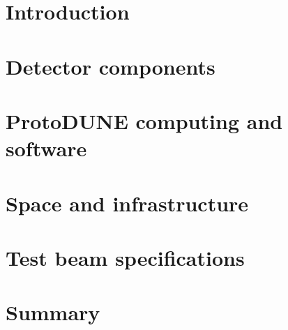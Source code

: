 \ifdefined\isfinal\documentclass[final]{pd-tdr}\else\documentclass{pd-tdr}\fi
\begin{document}






\chapter{Introduction}


\chapter{Detector components} 


\chapter{ProtoDUNE computing and software}


\chapter{Space and infrastructure}


\chapter{Test beam specifications} 


\chapter{Summary}
%

\cleardoublepage


\end{document}

